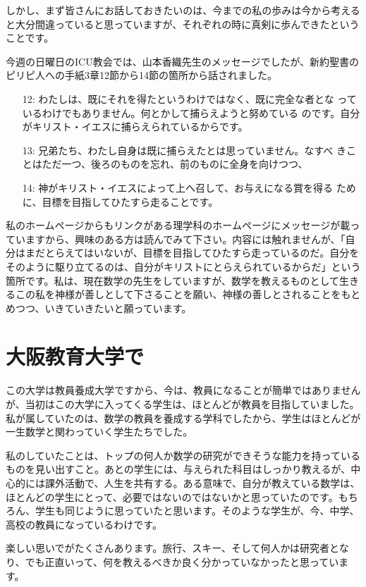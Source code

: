 \documentclass[12pt]{jarticle}
\begin{document}
しかし、まず皆さんにお話しておきたいのは、今までの私の歩みは今から考えると大分間違っていると思っていますが、それぞれの時に真剣に歩んできたということです。

今週の日曜日のICU教会では、山本香織先生のメッセージでしたが、新約聖書のピリピ人への手紙3章12節から14節の箇所から話されました。

\begin{itemize}
\item[12:] わたしは、既にそれを得たというわけではなく、既に完全な者とな
    っているわけでもありません。何とかして捕らえようと努めている
    のです。自分がキリスト・イエスに捕らえられているからです。
\item[13:] 兄弟たち、わたし自身は既に捕らえたとは思っていません。なすべ
    きことはただ一つ、後ろのものを忘れ、前のものに全身を向けつつ、
\item[14:] 神がキリスト・イエスによって上へ召して、お与えになる賞を得る
    ために、目標を目指してひたすら走ることです。
\end{itemize}

私のホームページからもリンクがある理学科のホームページにメッセージが載っていますから、興味のある方は読んでみて下さい。内容には触れませんが、「自分はまだとらえてはいないが、目標を目指してひたすら走っているのだ。自分をそのように駆り立てるのは、自分がキリストにとらえられているからだ」という箇所です。私は、現在数学の先生をしていますが、数学を教えるものとして生きるこの私を神様が善しとして下さることを願い、神様の善しとされることをもとめつつ、いきていきたいと願っています。

\section{大阪教育大学で}

この大学は教員養成大学ですから、今は、教員になることが簡単ではありませんが、当初はこの大学に入ってくる学生は、ほとんどが教員を目指していました。私が属していたのは、数学の教員を養成する学科でしたから、学生はほとんどが一生数学と関わっていく学生たちでした。

私のしていたことは、トップの何人か数学の研究ができそうな能力を持っているものを見い出すこと。あとの学生には、与えられた科目はしっかり教えるが、中心的には課外活動で、人生を共有する。ある意味で、自分が教えている数学は、ほとんどの学生にとって、必要ではないのではないかと思っていたのです。もちろん、学生も同じように思っていたと思います。そのような学生が、今、中学、高校の教員になっているわけです。

楽しい思いでがたくさんあります。旅行、スキー、そして何人かは研究者となり、でも正直いって、何を教えるべきか良く分かっていなかったと思っています。
\end{document}
